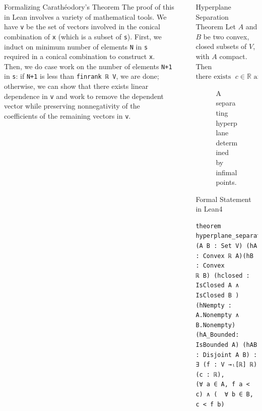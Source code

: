 \documentclass[final]{beamer}
\newlength{\sepwidth}
\newlength{\colwidth}
\newcommand{\separatorcolumn}{\begin{column}{\sepwidth}\end{column}}
\begin{document}
\begin{frame}[fragile]
\begin{columns}[t]
\begin{column}{\colwidth}
\begin{block}{Formalizing Carath\'eodory's Theorem}
              The proof of this in Lean involves a variety of mathematical tools. We have \verb|v| be the set of vectors involved in the conical combination of \verb|x| (which is a subset of \verb|s|). First, we induct on minimum number of elements \verb|N| in \verb|s| required in a conical combination to construct \verb|x|. Then, we do case work on the number of elements \verb|N+1| in \verb|s|: if \verb|N+1| is less than \verb|finrank ℝ V|, we are done; otherwise, we can show that there exists linear dependence in \verb|v| and work to remove the dependent vector while preserving nonnegativity of the coefficients of the remaining vectors in \verb|v|.  
            \end{block}    
            
            

        \end{column}

        \separatorcolumn

        \begin{column}{\colwidth}

            
          \begin{alertblock}{Hyperplane Separation Theorem}
            Let $A$ and $B$ be two convex, closed subsets of $V$, with $A$ compact. Then $
                \text{there exists } \; c\in \mathbb{R} \text{ and a linear functional } f : V\to \mathbb{R} \; \text{such that} \; f(a) < c \; \text{for all}\; a\in A \text{ and } \ c < f(b)\; \text{for all}\; b\in B.
              $
        \end{alertblock}

        \begin{figure}[htbp]
            \centering
            
            \caption{A separating hyperplane determined by infimal points. \label{fig:hyperplane-separation}}
        \end{figure}

\begin{block}{Formal Statement in Lean4}
\vspace{-0.5em}
\begin{Verbatim}
theorem hyperplane_separation  (A B : Set V) (hA : Convex ℝ A)(hB : Convex 
ℝ B) (hclosed : IsClosed A ∧ IsClosed B )(hNempty : A.Nonempty ∧ B.Nonempty) 
(hA_Bounded: IsBounded A) (hAB : Disjoint A B) : ∃ (f : V →ₗ[ℝ] ℝ) (c : ℝ),
(∀ a ∈ A, f a < c) ∧ (  ∀ b ∈ B, c < f b)
\end{Verbatim}
\end{block}


\end{column}
\end{columns}
\end{frame}
\end{document}
